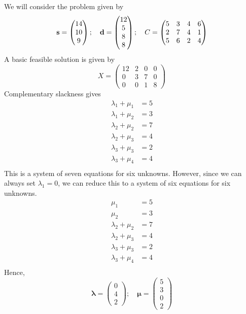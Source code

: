 We will consider the problem given by
\[
	\vb s = \begin{pmatrix}
		14 \\ 10 \\ 9
	\end{pmatrix};\quad \vb d = \begin{pmatrix}
		12 \\ 5 \\ 8 \\ 8
	\end{pmatrix};\quad C = \begin{pmatrix}
		5 & 3 & 4 & 6 \\
		2 & 7 & 4 & 1 \\
		5 & 6 & 2 & 4
	\end{pmatrix}
\]
A basic feasible solution is given by
\[
	X = \begin{pmatrix}
		12 & 2 & 0 & 0 \\
		0  & 3 & 7 & 0 \\
		0  & 0 & 1 & 8
	\end{pmatrix}
\]
Complementary slackness gives
\begin{align*}
	\lambda_1 + \mu_1 & = 5 \\
	\lambda_1 + \mu_2 & = 3 \\
	\lambda_2 + \mu_2 & = 7 \\
	\lambda_2 + \mu_3 & = 4 \\
	\lambda_3 + \mu_3 & = 2 \\
	\lambda_3 + \mu_4 & = 4 \\
\end{align*}
This is a system of seven equations for six unknowns.
However, since we can always set \( \lambda_1 = 0 \), we can reduce this to a system of six equations for six unknowns.
\begin{align*}
	\mu_1             & = 5 \\
	\mu_2             & = 3 \\
	\lambda_2 + \mu_2 & = 7 \\
	\lambda_2 + \mu_3 & = 4 \\
	\lambda_3 + \mu_3 & = 2 \\
	\lambda_3 + \mu_4 & = 4 \\
\end{align*}
Hence,
\[
	\bm\lambda = \begin{pmatrix}
		0 \\ 4 \\ 2
	\end{pmatrix};\quad \bm\mu = \begin{pmatrix}
		5 \\3\\0\\2
	\end{pmatrix}
\]

